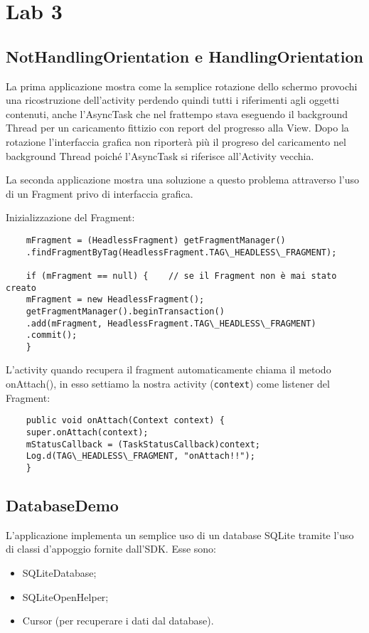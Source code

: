 	\section{Lab 3}

	\subsection{NotHandlingOrientation e HandlingOrientation}
	La prima applicazione mostra come la semplice rotazione dello schermo provochi una ricostruzione dell'activity perdendo quindi tutti i riferimenti agli oggetti contenuti, anche l'AsyncTask che nel frattempo stava eseguendo il background Thread per un caricamento fittizio con report del progresso alla View. Dopo la rotazione l'interfaccia grafica non riporterà più il progreso del caricamento nel background Thread poiché l'AsyncTask si riferisce all'Activity vecchia.

	La seconda applicazione mostra una soluzione a questo problema attraverso l'uso di un Fragment privo di interfaccia grafica.

	Inizializzazione del Fragment:

	\begin{lstlisting}
	mFragment = (HeadlessFragment) getFragmentManager()
	.findFragmentByTag(HeadlessFragment.TAG\_HEADLESS\_FRAGMENT);

	if (mFragment == null) {	// se il Fragment non è mai stato creato
	mFragment = new HeadlessFragment();
	getFragmentManager().beginTransaction()
	.add(mFragment, HeadlessFragment.TAG\_HEADLESS\_FRAGMENT)
	.commit();
	}
	\end{lstlisting}

	L'activity quando recupera il fragment automaticamente chiama il metodo onAttach(), in esso settiamo la nostra activity (\lstinline|context|) come listener del Fragment:

	\begin{lstlisting}
	public void onAttach(Context context) {
	super.onAttach(context);
	mStatusCallback = (TaskStatusCallback)context;
	Log.d(TAG\_HEADLESS\_FRAGMENT, "onAttach!!");
	}
	\end{lstlisting}



	\subsection{DatabaseDemo}
	L'applicazione implementa un semplice uso di un database SQLite tramite l'uso di classi d'appoggio fornite dall'SDK. Esse sono:
	\begin{itemize}
		\item SQLiteDatabase;
		\item SQLiteOpenHelper;
		\item Cursor (per recuperare i dati dal database).
	\end{itemize}

